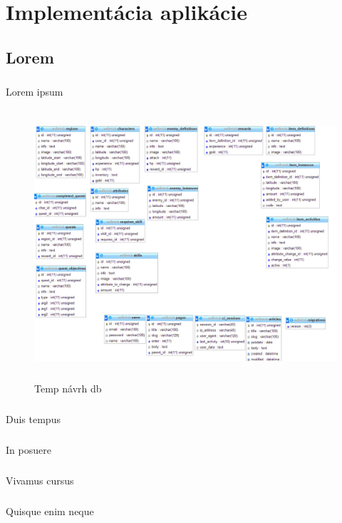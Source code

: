 \chapter{Implementácia aplikácie}
\section{Lorem}
\paragraph{}
Lorem ipsum 
\begin{figure}[h]
  \centering
  \includegraphics[height=10cm]{mainmatter/imgs/dbtemp.png}
  \caption{Temp návrh db}
  \label{fig:comenius}
\end{figure}
\paragraph{}
Duis tempus 

\paragraph{}
In posuere 

\paragraph{}
Vivamus cursus 

\paragraph{}
Quisque enim neque

